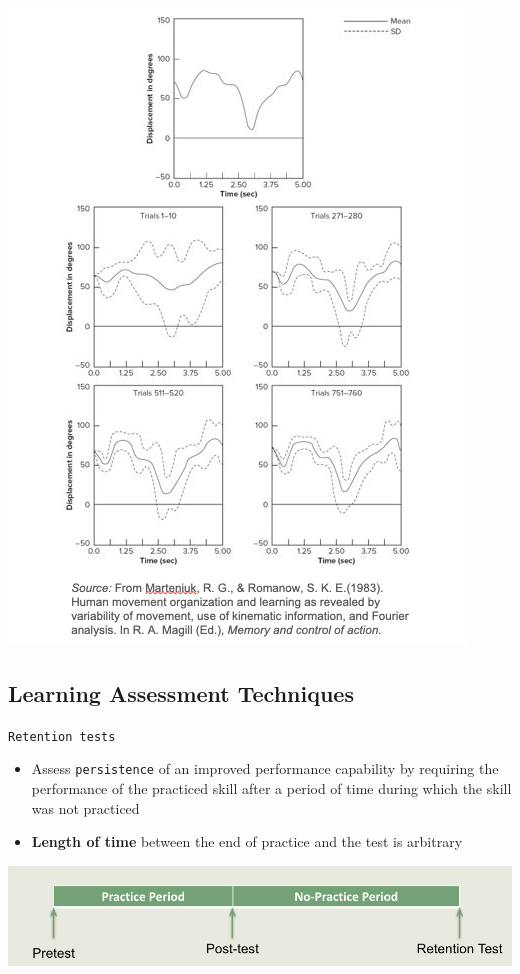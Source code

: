 \documentclass[
  letterpaper,
  DIV=11,
  numbers=noendperiod]{scrartcl}
\providecommand{\tightlist}{%
  \setlength{\itemsep}{0pt}\setlength{\parskip}{0pt}}\usepackage{longtable,booktabs,array}
\begin{document}
\includegraphics{images/Screenshot 2023-09-11 at 11.23.50 AM.png}

\hypertarget{learning-assessment-techniques-2}{%
\subsection{Learning Assessment
Techniques}\label{learning-assessment-techniques-2}}

\texttt{Retention\ tests}

\begin{itemize}
\tightlist
\item
  Assess \texttt{persistence} of an improved performance capability by
  requiring the performance of the practiced skill after a period of
  time during which the skill was not practiced
\item
  \textbf{Length of time} between the end of practice and the test is
  arbitrary
\end{itemize}

\includegraphics{images/Screenshot 2023-09-11 at 12.22.36 PM.png}
\end{document}
